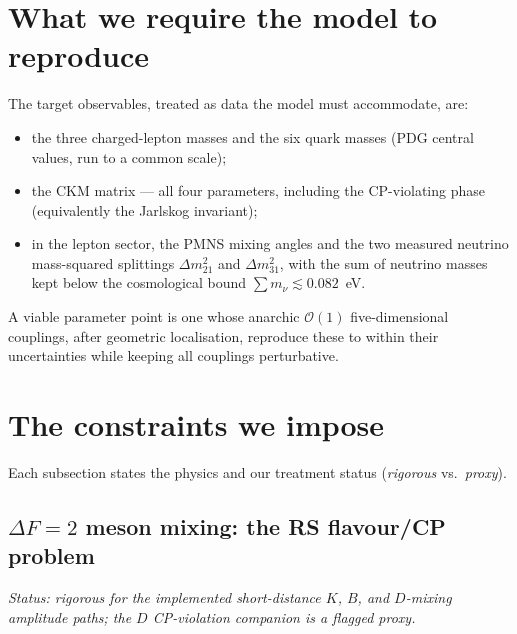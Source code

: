 \documentclass[11pt]{article}
\begin{document}
\section{What we require the model to reproduce}

The target observables, treated as data the model must accommodate, are:
\begin{itemize}[leftmargin=1.4em]
\item the three charged-lepton masses and the six quark masses (PDG central
values, run to a common scale);
\item the CKM matrix --- all four parameters, including the CP-violating phase
(equivalently the Jarlskog invariant);
\item in the lepton sector, the PMNS mixing angles and the two measured neutrino
mass-squared splittings $\Delta m^2_{21}$ and $\Delta m^2_{31}$, with the sum of
neutrino masses kept below the cosmological bound $\sum m_\nu \lesssim 0.082$~eV.
\end{itemize}
A viable parameter point is one whose anarchic $\mathcal{O}(1)$ five-dimensional
couplings, after geometric localisation, reproduce these to within their
uncertainties while keeping all couplings perturbative.

\section{The constraints we impose}
\label{sec:constraints}

Each subsection states the physics and our treatment status
(\emph{rigorous} vs.\ \emph{proxy}).

\subsection{$\Delta F=2$ meson mixing: the RS flavour/CP problem}

\emph{Status: rigorous for the implemented short-distance $K$, $B$, and
$D$-mixing amplitude paths; the $D$ CP-violation companion is a flagged proxy.}
\end{document}
